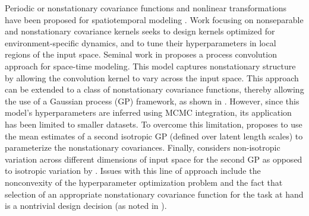 Periodic or nonstationary covariance functions and nonlinear transformations have been proposed for spatiotemporal modeling \cite{ma2003nonstationary,RasmussenWilliams2005}. Work focusing on nonseparable and nonstationary covariance kernels seeks to design kernels optimized for environment-specific dynamics, and to tune their hyperparameters in local regions of the input space. Seminal work in \cite{higdon1998process} proposes a process convolution approach for space-time modeling. This model captures nonstationary structure by allowing the convolution kernel to vary across the input space. This approach can be extended to a class of nonstationary covariance functions, thereby allowing the use of a Gaussian process (GP) framework, as shown in \cite{paciorek2004nonstationary}. However,  since this model's hyperparameters are inferred using MCMC integration, its application has been limited to smaller datasets. To overcome this limitation, \cite{plagemann2008nonstationary} proposes to use the mean estimates of a second isotropic GP (defined over latent length scales) to parameterize the nonstationary covariances. Finally, \cite{garg2012AAAI} considers non-isotropic variation across different dimensions of input space for the second GP as opposed to isotropic variation by \cite{plagemann2008nonstationary}. Issues with this line of approach include the nonconvexity of the hyperparameter optimization problem and the fact that selection of an appropriate nonstationary covariance function for the task at hand is a nontrivial design decision (as noted in \cite{singh2010modeling}). 

